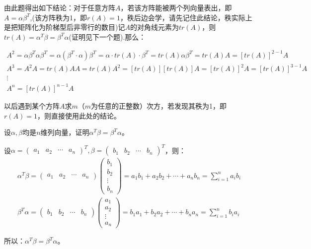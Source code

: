 \documentclass[a4paper]{report}
\begin{document}
\begin{tips}
由此题得出如下结论：对于任意方阵$A$，若该方阵能被两个列向量表出，即$A=\alpha\beta^T$,(该方阵秩为1，即$r(A)=1$，秩后边会学，请先记住此结论，秩实际上是把矩阵化为阶梯型后非零行的数目)记$A$的对角线元素为$tr(A)$，则$tr(A)=\alpha^T\beta=\beta^T\alpha$(证明见下一个题).那么：

\begin{gather*}
A^2=\alpha\beta^T\alpha\beta^T=\alpha(\beta^T\cdot\alpha)\beta^T=\alpha\cdot tr(A)\cdot\beta^T=tr(A)\alpha\beta^T=tr(A)A=[tr(A)]^{2-1}A\\
A^3=A^2A=tr(A)AA=tr(A)A^2=[tr(A)][tr(A)]A=[tr(A)]^2A=[tr(A)]^{3-1}A\\
\vdots\\
A^n=[tr(A)]^{n-1}A
\end{gather*}

以后遇到某个方阵$A$求$m$（$m$为任意的正整数）次方，若发现其秩为1，即$r(A)=1$，则直接使用此处的结论。
\end{tips}

\EX 设$\alpha,\beta$均是$n$维列向量，证明$\alpha^T\beta=\beta^T\alpha$。

\begin{zhengming}
设$\alpha=
\begin{pmatrix}
a_1&a_2&\cdots&a_n
\end{pmatrix}^T
,\beta=
\begin{pmatrix}
b_1&b_2&\cdots&b_n
\end{pmatrix}^T$，则：
\begin{gather*}
\alpha^T\beta=\begin{pmatrix}
a_1&a_2&\cdots&a_n
\end{pmatrix}\begin{pmatrix}
b_1\\ b_2\\ \vdots\\ b_n
\end{pmatrix}=a_1b_1+a_2b_2+\cdots+a_nb_n=\sum_{i=1}^{n}a_{i}b_{i}\\
\beta^T\alpha=\begin{pmatrix}
b_1&b_2&\cdots&b_n
\end{pmatrix}\begin{pmatrix}
a_1\\ a_2\\ \vdots\\ a_n
\end{pmatrix}=b_1a_1+b_2a_2+\cdots+b_na_n=\sum_{i=1}^{n}b_ia_i
\end{gather*}

所以：$\alpha^T\beta=\beta^T\alpha$。
\end{zhengming}
\clearpage
\end{document}

